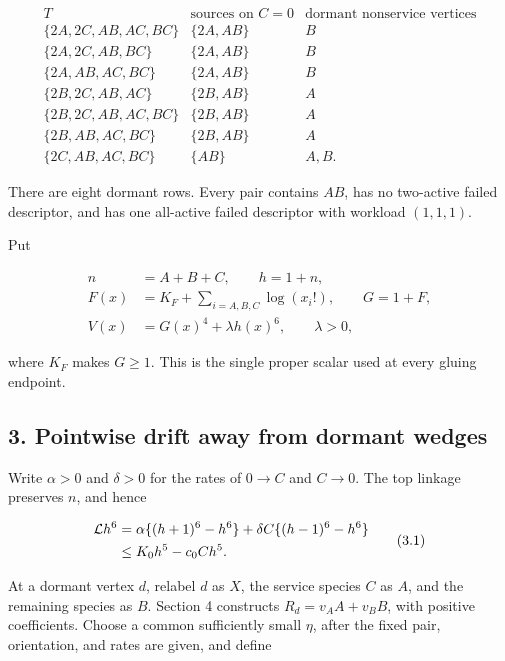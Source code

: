 \[
\begin{array}{c|c|c}
T&\text{sources on }C=0&\text{dormant nonservice vertices}\\ \hline
\{2A,2C,AB,AC,BC\}&\{2A,AB\}&B\\
\{2A,2C,AB,BC\}&\{2A,AB\}&B\\
\{2A,AB,AC,BC\}&\{2A,AB\}&B\\
\{2B,2C,AB,AC\}&\{2B,AB\}&A\\
\{2B,2C,AB,AC,BC\}&\{2B,AB\}&A\\
\{2B,AB,AC,BC\}&\{2B,AB\}&A\\
\{2C,AB,AC,BC\}&\{AB\}&A,B.
\end{array}                                             \tag{2.2}
\]

There are eight dormant rows. Every pair contains \(AB\), has no
two-active failed descriptor, and has one all-active failed descriptor
with workload \((1,1,1)\).

Put

\[
\begin{split}
 n&=A+B+C,\qquad h=1+n,\\
 F(x)&=K_F+\sum_{i=A,B,C}\log(x_i!),\qquad G=1+F,\\
 V(x)&=G(x)^4+\lambda h(x)^6,\qquad \lambda>0,
\end{split}                                             \tag{2.3}
\]

where \(K_F\) makes \(G\ge1\). This is the single proper scalar used at
every gluing endpoint.

\subsection{3. Pointwise drift away from dormant
wedges}

Write \(\alpha>0\) and \(\delta>0\) for the rates of \(0\to C\) and
\(C\to0\). The top linkage preserves \(n\), and hence

\[
\begin{split}
 {\cal L}h^6
 &=\alpha\{(h+1)^6-h^6\}
   +\delta C\{(h-1)^6-h^6\}\\
 &\le K_0h^5-c_0Ch^5.
\end{split}                                             \tag{3.1}
\]

At a dormant vertex \(d\), relabel \(d\) as \(X\), the service species
\(C\) as \(A\), and the remaining species as \(B\). Section 4 constructs
\(R_d=v_AA+v_BB\), with positive coefficients. Choose a common
sufficiently small \(\eta\), after the fixed pair, orientation, and
rates are given, and define

